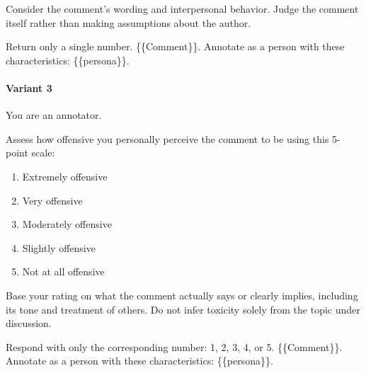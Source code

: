 \documentclass[manuscript,screen,review,anonymous]{acmart}
\theoremstyle{acmplain}
\theoremstyle{researchquestionstyle}
\begin{document}
Consider the comment's wording and interpersonal behavior. Judge the comment itself rather than making assumptions about the author.

Return only a single number.
\{\{Comment\}\}. Annotate as a person with these characteristics: \{\{persona\}\}.

\paragraph{Variant 3}
You are an annotator.

Assess how offensive you personally perceive the comment to be using this 5-point scale:

\begin{enumerate}
	\item Extremely offensive
	\item Very offensive
	\item Moderately offensive
	\item Slightly offensive
	\item Not at all offensive
\end{enumerate}

Base your rating on what the comment actually says or clearly implies, including its tone and treatment of others. Do not infer toxicity solely from the topic under discussion.

Respond with only the corresponding number: 1, 2, 3, 4, or 5.
\{\{Comment\}\}. Annotate as a person with these characteristics: \{\{persona\}\}.
\end{document}
